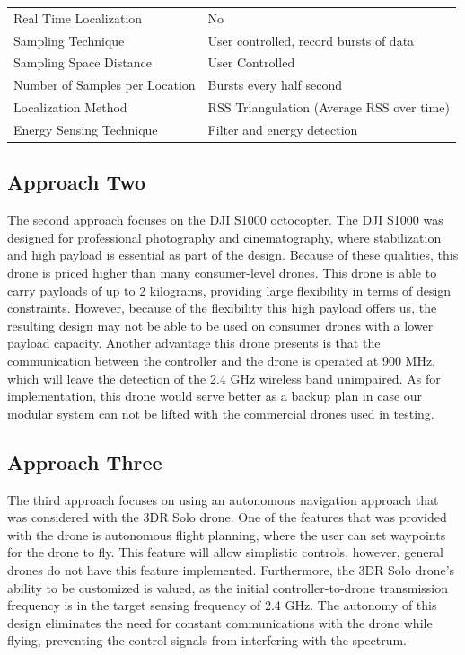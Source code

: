 \begin{table}[ht]
\begin{tabular}{|l|l|}
  	        Real Time Localization				& No 										\\
  	     	Sampling Technique 			 		& User controlled, record bursts of data 	\\
  	     	Sampling Space Distance 	  		& User Controlled 							\\
  	        Number of Samples per Location 		& Bursts every half second					\\
  	     	Localization Method		 			& RSS Triangulation (Average RSS over time)	\\
  	     	Energy Sensing Technique			& Filter and energy detection				\\ \hline
\end{tabular}
\end{table}\par

\subsection{Approach Two}
The second approach focuses on the DJI S1000 octocopter. The DJI S1000 was designed for professional photography and cinematography, where stabilization and high payload is essential as part of the design. Because of these qualities, this drone is priced higher than many consumer-level drones. This drone is able to carry payloads of up to 2 kilograms, providing large flexibility in terms of design constraints. However, because of the flexibility this high payload offers us, the resulting design may not be able to be used on consumer drones with a lower payload capacity. Another advantage this drone presents is that the communication between the controller and the drone is operated at 900 MHz, which will leave the detection of the 2.4 GHz wireless band unimpaired. As for implementation, this drone would serve better as a backup plan in case our modular system can not be lifted with the commercial drones used in testing.

\subsection{Approach Three}
The third approach focuses on using an autonomous navigation approach that was considered with the 3DR Solo drone. One of the features that was provided with the drone is autonomous flight planning, where the user can set waypoints for the drone to fly. This feature will allow simplistic controls, however, general drones do not have this feature implemented. Furthermore, the 3DR Solo drone’s ability to be customized is valued, as the initial controller-to-drone transmission frequency is in the target sensing frequency of 2.4 GHz. The autonomy of this design eliminates the need for constant communications with the drone while flying, preventing the control signals from interfering with the spectrum.

